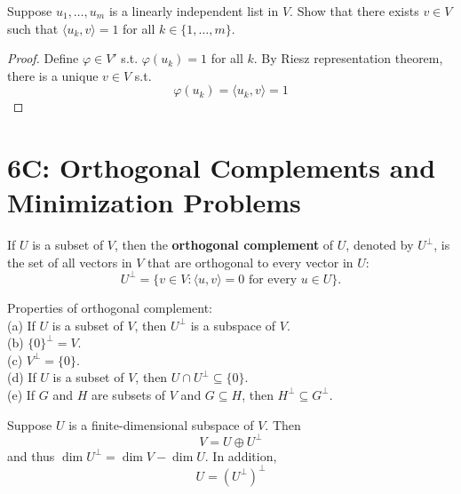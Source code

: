 \documentclass{extarticle}
\begin{document}
\begin{problem}{18}
    Suppose \(u_1, \ldots, u_m\) is a linearly independent list in \(V\). Show that there exists \(v \in V\)
    such that \(\langle u_k,v \rangle = 1\) for all \(k \in \{1, \ldots, m\}\).
\end{problem}

\begin{proof}
Define \(\varphi \in V'\) s.t. \(\varphi(u_k) = 1\) for all \(k\). By Riesz representation theorem, 
there is a unique \(v \in V\) s.t. 
\[\varphi(u_k) = \langle u_k, v \rangle = 1\]
\end{proof}


\newpage 
\section*{6C: Orthogonal Complements and Minimization Problems}

\begin{definition}
    If \(U\) is a subset of \(V\), then the \textbf{orthogonal complement} of \(U\), denoted by 
    \(U^\perp\), is the set of all vectors in \(V\) that are orthogonal to every vector in \(U\):
    \[U^\perp = \{v \in V \colon \langle u,v \rangle = 0 \text{ for every } u \in U\}.\]
\end{definition}

\begin{corollary}
    Properties of orthogonal complement: \\  
    (a) If \(U\) is a subset of \(V\), then \(U^\perp\) is a subspace of \(V\). \\ 
    (b) \(\{0\}^\perp = V\). \\ 
    (c) \(V^\perp = \{0\}\). \\ 
    (d) If \(U\) is a subset of \(V\), then \(U \cap U^\perp \subseteq \{0\}\). \\ 
    (e) If \(G\) and \(H\) are subsets of \(V\) and \(G \subseteq H\), then \(H^\perp \subseteq G^\perp\).
\end{corollary}

\begin{corollary}
    Suppose \(U\) is a finite-dimensional subspace of \(V\). Then 
    \[V = U \oplus U^\perp\]
    and thus \(\dim U^\perp = \dim V - \dim U\). In addition, 
    \[U = (U^\perp)^\perp\]
\end{corollary}
\end{document}
